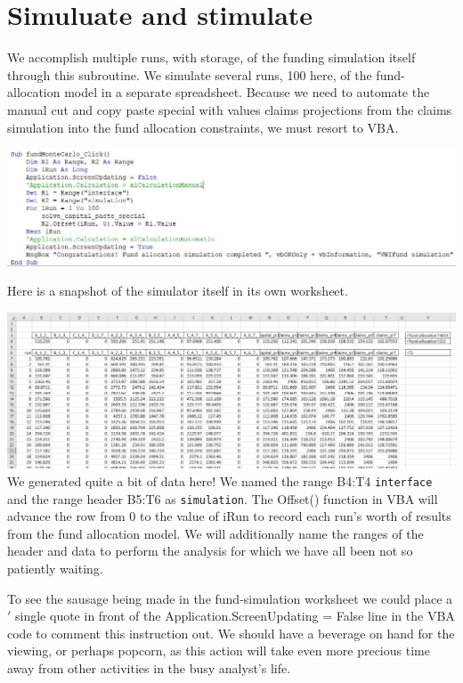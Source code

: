\documentclass[
]{book}
\begin{document}
\hypertarget{simuluate-and-stimulate}{%
\section{Simuluate and stimulate}\label{simuluate-and-stimulate}}

We accomplish multiple runs, with storage, of the funding simulation itself through this subroutine. We simulate several runs, 100 here, of the fund-allocation model in a separate spreadsheet. Because we need to automate the manual cut and copy paste special with values claims projections from the claims simulation into the fund allocation constraints, we must resort to VBA.

\includegraphics{images/06/claims-fund-sim-vba.jpg}

Here is a snapshot of the simulator itself in its own worksheet.

\includegraphics{images/06/claims-fund-simulation.jpg}
We generated quite a bit of data here! We named the range B4:T4 \texttt{interface} and the range header B5:T6 as \texttt{simulation}. The Offset() function in VBA will advance the row from 0 to the value of iRun to record each run's worth of results from the fund allocation model. We will additionally name the ranges of the header and data to perform the analysis for which we have all been not so patiently waiting.

To see the sausage being made in the fund-simulation worksheet we could place a \('\) single quote in front of the Application.ScreenUpdating = False line in the VBA code to comment this instruction out. We should have a beverage on hand for the viewing, or perhaps popcorn, as this action will take even more precious time away from other activities in the busy analyst's life.
\end{document}
